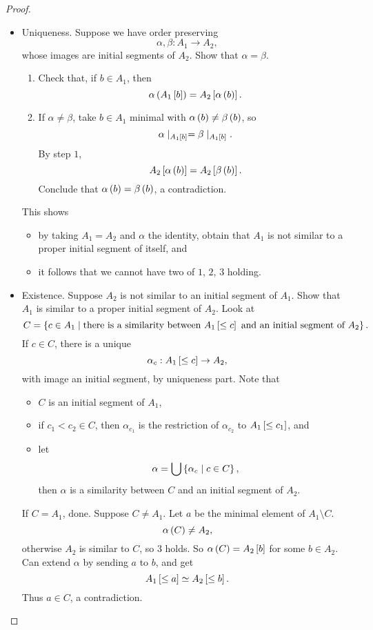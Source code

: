 \pagebreak

\begin{proof}
\hfill
\begin{itemize}
\item Uniqueness. Suppose we have order preserving
$$ \alpha, \beta : A_1 \to A_2, $$
whose images are initial segments of $ A_2 $. Show that $ \alpha = \beta $.
\begin{enumerate}[leftmargin=0.5in, label=Step \arabic*.]
\item Check that, if $ b \in A_1 $, then
$$ \alpha\rb{A_1\sb{b}} = A_2\sb{\alpha\rb{b}}. $$
\item If $ \alpha \ne \beta $, take $ b \in A_1 $ minimal with $ \alpha\rb{b} \ne \beta\rb{b} $, so
$$ \alpha \mid_{A_1\sb{b}} = \beta \mid_{A_1\sb{b}}. $$
By step $ 1 $,
$$ A_2\sb{\alpha\rb{b}} = A_2\sb{\beta\rb{b}}. $$
Conclude that $ \alpha\rb{b} = \beta\rb{b} $, a contradiction.
\end{enumerate}
This shows
\begin{itemize}
\item by taking $ A_1 = A_2 $ and $ \alpha $ the identity, obtain that $ A_1 $ is not similar to a proper initial segment of itself, and
\item it follows that we cannot have two of $ 1 $, $ 2 $, $ 3 $ holding.
\end{itemize}
\item Existence. Suppose $ A_2 $ is not similar to an initial segment of $ A_1 $. Show that $ A_1 $ is similar to a proper initial segment of $ A_2 $. Look at
$$ C = \cb{c \in A_1 \mid \text{there is a similarity between} \ A_1\sb{\le c} \ \text{and an initial segment of} \ A_2}. $$
If $ c \in C $, there is a unique
$$ \alpha_c : A_1\sb{\le c} \to A_2, $$
with image an initial segment, by uniqueness part. Note that
\begin{itemize}
\item $ C $ is an initial segment of $ A_1 $,
\item if $ c_1 < c_2 \in C $, then $ \alpha_{c_1} $ is the restriction of $ \alpha_{c_2} $ to $ A_1\sb{\le c_1} $, and
\item let
$$ \alpha = \bigcup \cb{\alpha_c \mid c \in C}, $$
then $ \alpha $ is a similarity between $ C $ and an initial segment of $ A_2 $.
\end{itemize}
If $ C = A_1 $, done. Suppose $ C \ne A_1 $. Let $ a $ be the minimal element of $ A_1 \setminus C $.
$$ \alpha\rb{C} \ne A_2, $$
otherwise $ A_2 $ is similar to $ C $, so $ 3 $ holds. So $ \alpha\rb{C} = A_2\sb{b} $ for some $ b \in A_2 $. Can extend $ \alpha $ by sending $ a $ to $ b $, and get
$$ A_1\sb{\le a} \simeq A_2\sb{\le b}. $$
Thus $ a \in C $, a contradiction.
\end{itemize}
\end{proof}


